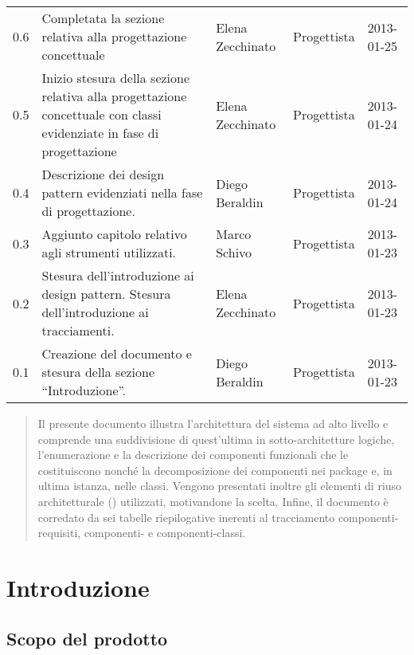 \begin{center}
\begin{longtable}{lp{}lll}
0.6 & Completata la sezione relativa alla progettazione concettuale &Elena Zecchinato & Progettista & 2013-01-25\\
0.5 & Inizio stesura della sezione relativa alla progettazione concettuale con classi evidenziate in fase di progettazione &Elena Zecchinato& Progettista & 2013-01-24\\
0.4 & Descrizione dei design pattern evidenziati nella fase di progettazione. &Diego Beraldin & Progettista & 2013-01-24\\
0.3 & Aggiunto capitolo relativo agli strumenti utilizzati.& Marco Schivo & Progettista & 2013-01-23\\
0.2 & Stesura dell'introduzione ai design pattern. Stesura dell'introduzione ai tracciamenti. &Elena Zecchinato & Progettista & 2013-01-23\\
0.1 & Creazione del documento e stesura della sezione ``Introduzione''. &Diego Beraldin & Progettista & 2013-01-23\\
\bottomrule
\end{longtable}
\end{center}
\clearpage



\setcounter{page}{1}
\pagestyle{normal}

\clearpage

\begin{abstract}
Il presente documento illustra l'architettura del sistema ad alto livello e comprende una suddivisione di quest'ultima in sotto-architetture logiche, l'enumerazione e la descrizione dei componenti funzionali che le costituiscono nonché la decomposizione dei componenti nei package e, in ultima istanza, nelle classi. Vengono presentati inoltre gli elementi di riuso architetturale () utilizzati, motivandone la scelta. Infine, il documento è corredato da sei tabelle riepilogative inerenti al tracciamento componenti-requisiti, componenti-\underline{} e componenti-classi.
\end{abstract}
\clearpage

\section{Introduzione}
\subsection{Scopo del prodotto}
\purpose

